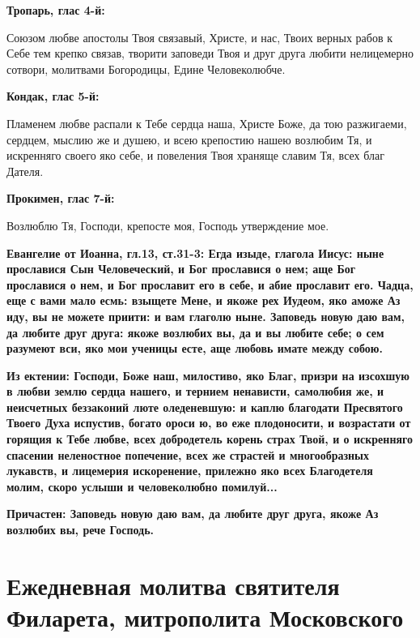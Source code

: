 \bfseries Тропарь, глас 4-й:\normalfont{}


Союзом любве апостолы Твоя связавый, Христе, и нас, Твоих верных рабов к Себе тем крепко связав, творити заповеди Твоя и друг друга любити нелицемерно сотвори, молитвами Богородицы, Едине Человеколюбче.


\medskip


\bfseries Кондак, глас 5-й:\normalfont{}


Пламенем любве распали к Тебе сердца наша, Христе Боже, да тою разжигаеми, сердцем, мыслию же и душею, и всею крепостию нашею возлюбим Тя, и искренняго своего яко себе, и повеления Твоя храняще славим Тя, всех благ Дателя.


\medskip


\bfseries Прокимен, глас 7-й:\normalfont{}


Возлюблю Тя, Господи, крепосте моя, Господь утверждение мое.


\bfseries Евангелие от Иоанна, гл.13, ст.31-3:\normalfont{} Егда изыде, глагола Иисус: ныне прославися Сын Человеческий, и Бог прославися о нем; аще Бог прославися о нем, и Бог прославит его в себе, и абие прославит его. Чадца, еще с вами мало есмь: взыщете Мене, и якоже рех Иудеом, яко аможе Аз иду, вы не можете приити: и вам глаголю ныне. Заповедь новую даю вам, да любите друг друга: якоже возлюбих вы, да и вы любите себе; о сем разумеют вси, яко мои ученицы есте, аще любовь имате между собою.


\bfseries Из ектении:\normalfont{} Господи, Боже наш, милостиво, яко Благ, призри на изсохшую в любви землю сердца нашего, и тернием ненависти, самолюбия же, и неисчетных беззаконий люте оледеневшую: и каплю благодати Пресвятого Твоего Духа испустив, богато ороси ю, во еже плодоносити, и возрастати от горящия к Тебе любве, всех добродетель корень страх Твой, и о искренняго спасении неленостное попечение, всех же страстей и многообразных лукавств, и лицемерия искоренение, прилежно яко всех Благодетеля молим, скоро услыши и человеколюбно помилуй...


\bfseries Причастен:\normalfont{} Заповедь новую даю вам, да любите друг друга, якоже Аз возлюбих вы, рече Господь.


\section{Ежедневная молитва святителя Филарета, митрополита Московского}
 


